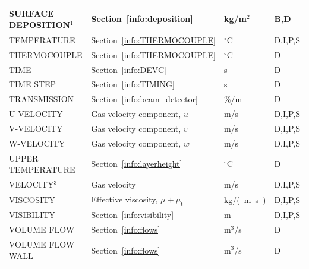 \documentclass[11pt]{book}
\begin{document}
\begin{longtable}{@{\extracolsep{\fill}}|l|l|l|l|}
{\ct SURFACE DEPOSITION}$^1$                    & Section~\ref{info:deposition}                 & kg/m$^2$       & B,D          \\ \hline
{\ct TEMPERATURE}                               & Section~\ref{info:THERMOCOUPLE}               & $^\circ$C      & D,I,P,S      \\ \hline
{\ct THERMOCOUPLE}                              & Section~\ref{info:THERMOCOUPLE}               & $^\circ$C      & D            \\ \hline
{\ct TIME}                                      & Section~\ref{info:DEVC}                       & s              & D            \\ \hline
{\ct TIME STEP}                                 & Section~\ref{info:TIMING}                     & s              & D            \\ \hline
{\ct TRANSMISSION}                              & Section~\ref{info:beam_detector}              & \%/m           & D            \\ \hline
{\ct U-VELOCITY}                                & Gas velocity component, $u$                   & m/s            & D,I,P,S      \\ \hline
{\ct V-VELOCITY}                                & Gas velocity component, $v$                   & m/s            & D,I,P,S      \\ \hline
{\ct W-VELOCITY}                                & Gas velocity component, $w$                   & m/s            & D,I,P,S      \\ \hline
{\ct UPPER TEMPERATURE}                         & Section~\ref{info:layerheight}                & $^\circ$C      & D            \\ \hline
{\ct VELOCITY}$^3$                              & Gas velocity                                  & m/s            & D,I,P,S      \\ \hline
{\ct VISCOSITY}                                 & Effective viscosity, $\mu + \mu_{\mathrm{t}}$ & \si{kg/(m.s)}  & D,I,P,S      \\ \hline
{\ct VISIBILITY}                                & Section~\ref{info:visibility}                 & m              & D,I,P,S      \\ \hline
{\ct VOLUME FLOW}                               & Section~\ref{info:flows}                      & m$^3$/s        & D            \\ \hline
{\ct VOLUME FLOW WALL}                          & Section~\ref{info:flows}                      & m$^3$/s        & D            \\ \hline

\end{longtable}
\end{document}
